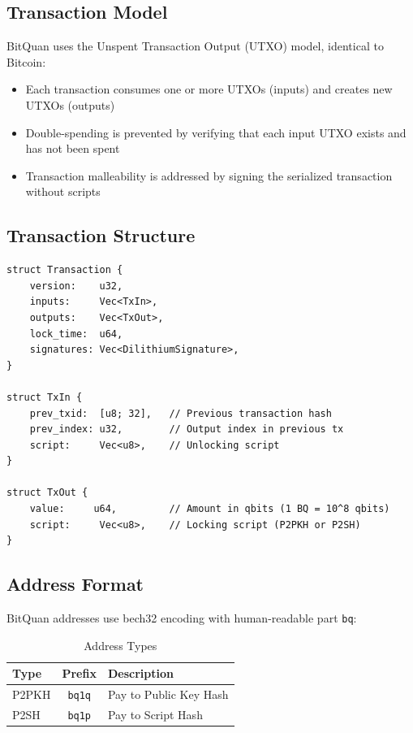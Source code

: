 \documentclass[11pt,a4paper]{article}
\begin{document}
\subsection{Transaction Model}

BitQuan uses the Unspent Transaction Output (UTXO) model, identical to Bitcoin:

\begin{itemize}[leftmargin=*]
    \item Each transaction consumes one or more UTXOs (inputs) and creates new UTXOs (outputs)
    \item Double-spending is prevented by verifying that each input UTXO exists and has not been spent
    \item Transaction malleability is addressed by signing the serialized transaction without scripts
\end{itemize}

\subsection{Transaction Structure}

\begin{lstlisting}[caption={Transaction structure (simplified)}]
struct Transaction {
    version:    u32,
    inputs:     Vec<TxIn>,
    outputs:    Vec<TxOut>,
    lock_time:  u64,
    signatures: Vec<DilithiumSignature>,
}

struct TxIn {
    prev_txid:  [u8; 32],   // Previous transaction hash
    prev_index: u32,        // Output index in previous tx
    script:     Vec<u8>,    // Unlocking script
}

struct TxOut {
    value:     u64,         // Amount in qbits (1 BQ = 10^8 qbits)
    script:     Vec<u8>,    // Locking script (P2PKH or P2SH)
}
\end{lstlisting}

\subsection{Address Format}

BitQuan addresses use bech32 encoding with human-readable part \texttt{bq}:

\begin{table}[H]
\centering
\caption{Address Types}
\begin{tabular}{@{}lcl@{}}
\toprule
\textbf{Type} & \textbf{Prefix} & \textbf{Description} \\
\midrule
P2PKH & \texttt{bq1q} & Pay to Public Key Hash \\
P2SH & \texttt{bq1p} & Pay to Script Hash \\
\bottomrule
\end{tabular}
\end{table}
\end{document}
